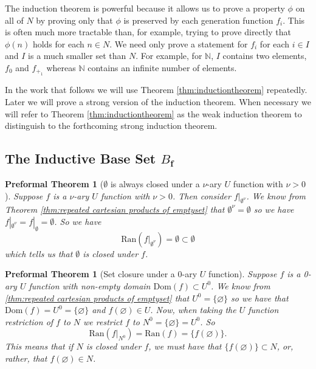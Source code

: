 \documentclass[oneside, 12pt]{book}
\theoremstyle{break}
\newtheorem{preformal definition}[definition]{Preformal Definition}
\newtheorem{preformal theorem}[theorem]{Preformal Theorem}
\newcommand{\bv}[1]{\boldsymbol{#1}}
\newcommand{\N}[0]{\mathbb{N}}
\begin{document}
				The induction theorem is powerful because it allows us to prove a property $\phi$ on all of $N$ by proving only that $\phi$ is preserved by each generation function $f_i$.
				This is often much more tractable than, for example, trying to prove directly that $\phi(n)$ holds for each $n\in N$.
				We need only prove a statement for $f_i$ for each $i\in I$ and $I$ is a much smaller set than $N$.
				For example, for $\N$, $I$ contains two elements, $f_0$ and $f_{+_1}$ whereas $\N$ contains an infinite number of elements.
				
				In the work that follows we will use Theorem \ref{thm:inductiontheorem} repeatedly.
				Later we will prove a strong version of the induction theorem.
				When necessary we will refer to Theorem \ref{thm:inductiontheorem} as the weak induction theorem to distinguish to the forthcoming strong induction theorem.
				
			\subsection{The Inductive Base Set $B_{\bv{f}}$}
			
				\begin{preformal theorem}[$\emptyset$ is always closed under a $\nu$-ary $U$ function with $\nu> 0$]
					Suppose $f$ is a $\nu$-ary $U$ function with $\nu>0$.
					Then consider $f|_{\emptyset^{\nu}}$.
					We know from Theorem \ref{thm:repeated cartesian products of emptyset} that $\emptyset^{\nu} = \emptyset$ so we have $f|_{\emptyset^{\nu}} = f|_{\emptyset} = \emptyset$.
					So we have
					\begin{equation*}
						\text{Ran}(f|_{\emptyset^{\nu}}) = \emptyset \subset \emptyset
					\end{equation*}
					which tells us that $\emptyset$ is closed under $f$.
				\end{preformal theorem}
			
				\begin{preformal theorem}[Set closure under a 0-ary $U$ function]
					\label{thm:set closure under 0-ary U function}
					Suppose $f$ is a 0-ary $U$ function with non-empty domain $\text{Dom}(f) \subset U^0$.
					We know from \ref{thm:repeated cartesian products of emptyset} that $U^0 = \{\varnothing\}$ so we have that $\text{Dom}(f) = U^0 = \{\varnothing\}$ and $f(\varnothing) \in U$.
					Now, when taking the $U$ function restriction of $f$ to $N$ we restrict $f$ to $N^0 = \{\varnothing\} = U^0$.
					So
					\begin{equation*}
						\text{Ran}(f|_{N^0}) = \text{Ran}(f) = \{f(\varnothing)\}.
					\end{equation*}
					This means that if $N$ is closed under $f$, we must have that $\{f(\varnothing)\} \subset N$, or, rather, that $f(\varnothing) \in N$.
				\end{preformal theorem}
			
\end{document}

